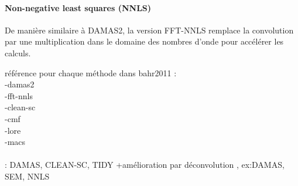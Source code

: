 \paragraph{Non-negative least squares (NNLS)}

De manière similaire à DAMAS2, la version FFT-NNLS remplace la convolution par une multiplication dans le domaine des nombres d'onde pour accélérer les calculs.

référence pour chaque méthode dans bahr2011 : \\
-damas2\\

-fft-nnls\\

-clean-sc\\

-cmf\\

-lore\\

-macs\\




~\\  : DAMAS, CLEAN-SC, TIDY
+amélioration par déconvolution , ex:DAMAS, SEM, NNLS







